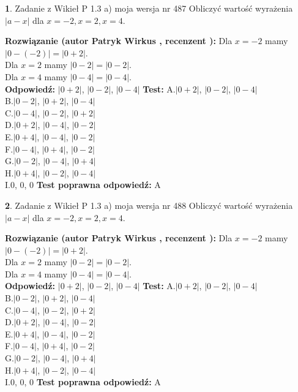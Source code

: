 \documentclass[12pt, a4paper]{article}
\theoremstyle{definition} %
\newtheorem{zad}{}
\newcommand{\zadStart}[1]{\begin{zad}#1\newline}
\newcommand{\zadStop}{\end{zad}}
\newcommand{\rozwStart}[2]{\noindent \textbf{Rozwiązanie (autor #1 , recenzent #2): }\newline}
\newcommand{\rozwStop}{\newline}
\newcommand{\odpStart}{\noindent \textbf{Odpowiedź:}\newline}
\newcommand{\odpStop}{\newline}
\newcommand{\testStart}{\noindent \textbf{Test:}\newline}
\newcommand{\testStop}{\newline}
\newcommand{\kluczStart}{\noindent \textbf{Test poprawna odpowiedź:}\newline}
\newcommand{\kluczStop}{\newline}
\begin{document}
\zadStart{Zadanie z Wikieł P 1.3 a) moja wersja nr 487}
Obliczyć wartość wyrażenia $|a - x|$ dla $x=-2,x=2,x=4$.
\zadStop
\rozwStart{Patryk Wirkus}{}
Dla $x = -2$ mamy $|0 - (-2)| = |0 + 2|$.\\
Dla $x = 2$ mamy $|0 - 2| = |0 - 2|$.\\
Dla $x = 4$ mamy $|0 - 4| = |0 - 4|$.\\
\rozwStop
\odpStart
$|0 + 2|$, $|0 - 2|$, $|0 - 4|$
\odpStop
\testStart
A.$|0 + 2|$, $|0 - 2|$, $|0 - 4|$\\
B.$|0 - 2|$, $|0 + 2|$, $|0 - 4|$\\
C.$|0 - 4|$, $|0 - 2|$, $|0 + 2|$\\
D.$|0 + 2|$, $|0 - 4|$, $|0 - 2|$\\
E.$|0 + 4|$, $|0 - 4|$, $|0 - 2|$\\
F.$|0 - 4|$, $|0 + 4|$, $|0 - 2|$\\
G.$|0 - 2|$, $|0 - 4|$, $|0 + 4|$\\
H.$|0 + 4|$, $|0 - 2|$, $|0 - 4|$\\
I.$0$, $0$, $0$
\testStop
\kluczStart
A
\kluczStop



\zadStart{Zadanie z Wikieł P 1.3 a) moja wersja nr 488}
Obliczyć wartość wyrażenia $|a - x|$ dla $x=-2,x=2,x=4$.
\zadStop
\rozwStart{Patryk Wirkus}{}
Dla $x = -2$ mamy $|0 - (-2)| = |0 + 2|$.\\
Dla $x = 2$ mamy $|0 - 2| = |0 - 2|$.\\
Dla $x = 4$ mamy $|0 - 4| = |0 - 4|$.\\
\rozwStop
\odpStart
$|0 + 2|$, $|0 - 2|$, $|0 - 4|$
\odpStop
\testStart
A.$|0 + 2|$, $|0 - 2|$, $|0 - 4|$\\
B.$|0 - 2|$, $|0 + 2|$, $|0 - 4|$\\
C.$|0 - 4|$, $|0 - 2|$, $|0 + 2|$\\
D.$|0 + 2|$, $|0 - 4|$, $|0 - 2|$\\
E.$|0 + 4|$, $|0 - 4|$, $|0 - 2|$\\
F.$|0 - 4|$, $|0 + 4|$, $|0 - 2|$\\
G.$|0 - 2|$, $|0 - 4|$, $|0 + 4|$\\
H.$|0 + 4|$, $|0 - 2|$, $|0 - 4|$\\
I.$0$, $0$, $0$
\testStop
\kluczStart
A
\kluczStop
\end{document}
